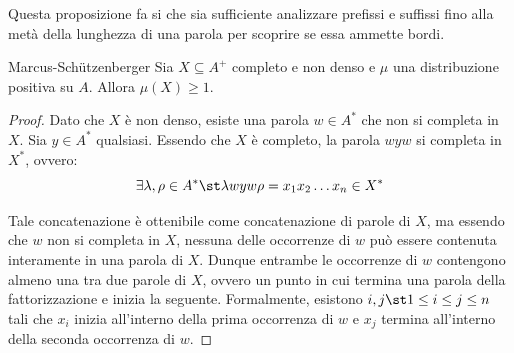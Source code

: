 Questa proposizione fa si che sia sufficiente analizzare prefissi e suffissi fino alla metà della lunghezza di una parola per scoprire se essa ammette bordi.

\begin{lemma}[label=lem:marcus-schutzenberger]{Marcus-Schützenberger}
  Sia \(X \subseteq A^+\) completo e non denso e \(\mu\) una distribuzione positiva su \(A\).
  Allora \(\mu(X) \geq 1\).
\end{lemma}
\begin{proof}
  Dato che \(X\) è non denso, esiste una parola \(w \in A^*\) che non si completa in \(X\).
  Sia \(y \in A^*\) qualsiasi.
  Essendo che \(X\) è completo, la parola \(wyw\) si completa in \(X^*\), ovvero:
  \[\exists \lambda,\rho \in A^*\st \lambda w y w \rho  = x_1x_2\ldots x_n\in X^*\]
  \begin{figure}[H]
    \centering
  \end{figure}

  Tale concatenazione è ottenibile come concatenazione di parole di \(X\), ma essendo che \(w\) non si completa in \(X\), nessuna delle occorrenze di \(w\) può essere contenuta interamente in una parola di \(X\).
  Dunque entrambe le occorrenze di \(w\) contengono almeno una  tra due parole di \(X\), ovvero un punto in cui termina una parola della fattorizzazione e inizia la seguente.
  Formalmente, esistono \(i,j \st 1 \leq i \leq j \leq n\) tali che \(x_i\) inizia all'interno della prima occorrenza di \(w\) e \(x_j\) termina all'interno della seconda occorrenza di \(w\).


\end{proof}
